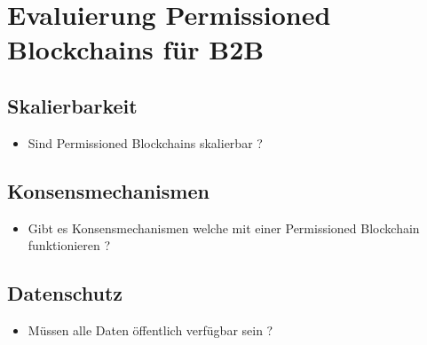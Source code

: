 \chapter{Evaluierung Permissioned Blockchains für B2B}
\label{cha:b2b-eval}

\section{Skalierbarkeit}
\begin{itemize}
    \item Sind Permissioned Blockchains skalierbar ?
\end{itemize}

\label{subsec:eval-konsens}
\section{Konsensmechanismen}
\begin{itemize}
    \item Gibt es Konsensmechanismen welche mit einer Permissioned Blockchain funktionieren ?
\end{itemize}

\section{Datenschutz}
\begin{itemize}
    \item Müssen alle Daten öffentlich verfügbar sein ?
\end{itemize}


